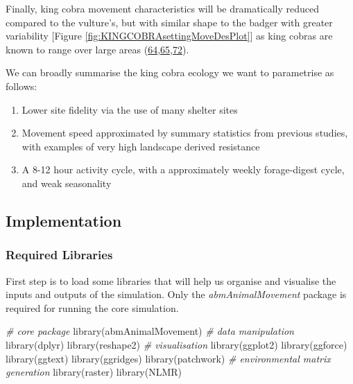 \documentclass[10pt,a4paper]{article}
\newenvironment{Shaded}{}{}
\newcommand{\CommentTok}[1]{\textit{#1}}
\newcommand{\FunctionTok}[1]{#1}
\newcommand{\NormalTok}[1]{#1}
\begin{document}
Finally, king cobra movement characteristics will be dramatically reduced compared to the vulture's, but with similar shape to the badger with greater variability {[}Figure \ref{fig:KINGCOBRAsettingMoveDesPlot}{]} as king cobras are known to range over large areas (\protect\hyperlink{ref-Marshall2018}{64},\protect\hyperlink{ref-marshall_no_2020}{65},\protect\hyperlink{ref-Silva2018}{72}).

We can broadly summarise the king cobra ecology we want to parametrise as follows:

\begin{enumerate}
\def\labelenumi{\arabic{enumi}.}
\item
  Lower site fidelity via the use of many shelter sites
\item
  Movement speed approximated by summary statistics from previous studies, with examples of very high landscape derived resistance
\item
  A 8-12 hour activity cycle, with a approximately weekly forage-digest cycle, and weak seasonality
\end{enumerate}

\hypertarget{implementation}{%
\subsection{Implementation}\label{implementation}}

\hypertarget{required-libraries}{%
\subsubsection{Required Libraries}\label{required-libraries}}

First step is to load some libraries that will help us organise and visualise the inputs and outputs of the simulation.
Only the \emph{abmAnimalMovement} package is required for running the core simulation.

\begin{Shaded}
\begin{Highlighting}[]
\CommentTok{\# core package}
\FunctionTok{library}\NormalTok{(abmAnimalMovement)}
\CommentTok{\# data manipulation}
\FunctionTok{library}\NormalTok{(dplyr)}
\FunctionTok{library}\NormalTok{(reshape2)}
\CommentTok{\# visualisation}
\FunctionTok{library}\NormalTok{(ggplot2)}
\FunctionTok{library}\NormalTok{(ggforce)}
\FunctionTok{library}\NormalTok{(ggtext)}
\FunctionTok{library}\NormalTok{(ggridges)}
\FunctionTok{library}\NormalTok{(patchwork)}
\CommentTok{\# environmental matrix generation}
\FunctionTok{library}\NormalTok{(raster)}
\FunctionTok{library}\NormalTok{(NLMR)}
\end{Highlighting}
\end{Shaded}
\end{document}
